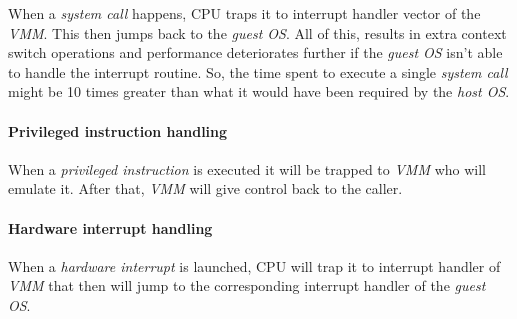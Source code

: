 \bigskip\noindent
\begin{minipage}[t]{0.48\textwidth}
    When a \emph{system call} happens, CPU traps it to interrupt handler vector
    of the \emph{VMM}. This then jumps back to the \emph{guest OS}. All of this,
    results in extra context switch operations and performance deteriorates
    further if the \emph{guest OS} isn't able to handle the interrupt
    routine. So, the time spent to execute a single \emph{system call} might
    be 10 times greater than what it would have been required by the \emph{host
    OS}.
\end{minipage}
\begin{minipage}[t]{0.48\textwidth}
    \centering
    \strut\vspace*{-\baselineskip}\newline
\end{minipage}

\newpage
\paragraph{Privileged instruction handling}
\mbox{}

\bigskip\noindent
\begin{minipage}[t]{0.48\textwidth}
    When a \emph{privileged instruction} is executed it will be trapped to
    \emph{VMM} who will emulate it. After that, \emph{VMM} will give control back
    to the caller.
\end{minipage}\hfill
\begin{minipage}[t]{0.48\textwidth}
    \centering
    \strut\vspace*{-\baselineskip}\newline
\end{minipage}

\paragraph{Hardware interrupt handling}
\mbox{}

\bigskip\noindent
\begin{minipage}[t]{0.48\textwidth}
    When a \emph{hardware interrupt} is launched, CPU will trap it to interrupt
    handler of \emph{VMM} that then will jump to the corresponding interrupt
    handler of the \emph{guest OS}.
\end{minipage}\hfill
\begin{minipage}[t]{0.48\textwidth}
    \centering
    \strut\vspace*{-\baselineskip}\newline
\end{minipage}


